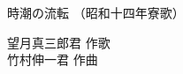 \documentclass[10pt,b5j]{tarticle} %
\begin{document}
\begin{minipage}[c]{0.7\hsize} %
    \begin{center}
        {\LARGE
            時潮の流転 %
        }
        {\small 
            （昭和十四年寮歌） %
        }
    \end{center}
\end{minipage}
\begin{minipage}[c]{0.3\hsize} %
    \begin{flushright} %
        望月真三郎君 作歌\\竹村伸一君 作曲 %
    \end{flushright}
\end{minipage}
\end{document}
